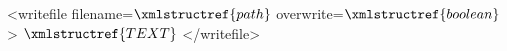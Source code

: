 <writefile filename=$\xmlstructref{path}$ overwrite=$\xmlstructref{boolean}$>
  $\xmlstructref{TEXT}$
</writefile>
